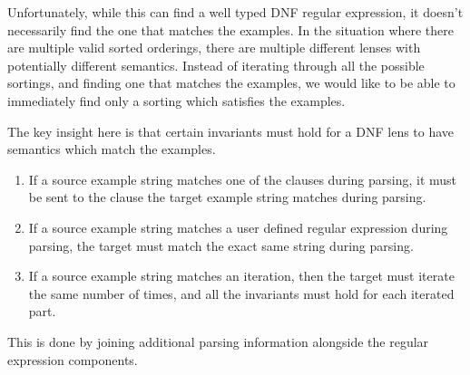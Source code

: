 Unfortunately, while this can find a well typed DNF regular expression, it doesn't
necessarily find the one that matches the examples.  In the situation where
there are multiple valid sorted orderings, there are multiple different lenses
with potentially different semantics.  Instead of iterating through all the
possible sortings, and finding one that matches the examples, we would like to
be able to immediately find only a sorting which satisfies the examples.

The key insight here is that certain invariants must hold for a DNF lens to have
semantics which match the examples.

\begin{enumerate}
\item If a source example string matches one of the clauses during parsing,
it must be sent to the clause the target example string matches during parsing.
\item If a source example string matches a user defined regular expression during
parsing, the target must match the exact same string during parsing.
\item If a source example string matches an iteration, then the target must iterate
the same number of times, and all the invariants must hold for each iterated part.
\end{enumerate}

This is done by joining additional parsing information alongside the regular
expression components.



